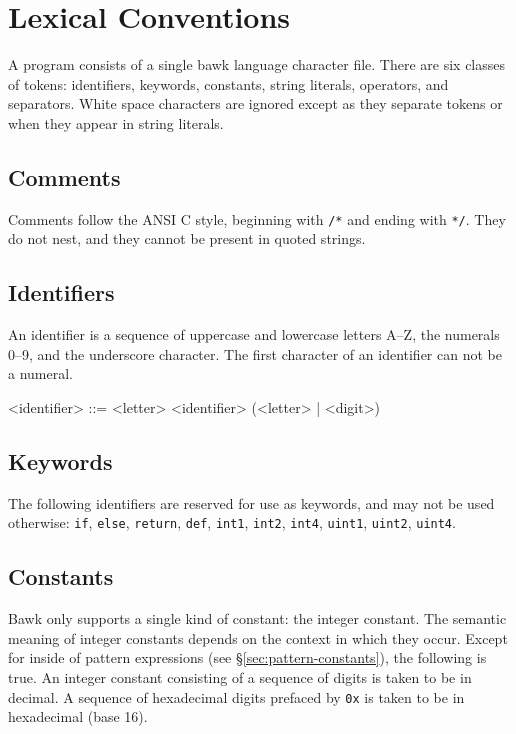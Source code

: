 \section{Lexical Conventions}
A program consists of a single bawk language character file.  There are six classes of tokens: identifiers, keywords, constants, string literals, operators, and separators.  White space characters are ignored except as they separate tokens or when they appear in string literals.

\subsection{Comments}
Comments follow the ANSI C style, beginning with \texttt{/*} and ending with \texttt{*/}.  They do not nest, and they cannot be present in quoted strings.

\subsection{Identifiers}
\label{sec:identifiers}
An identifier is a sequence of uppercase and lowercase letters A--Z, the numerals 0--9, and the underscore character.  The first character of an identifier can not be a numeral.

\begin{grammar}
<identifier> ::= <letter>
\alt <identifier> (<letter> | <digit>)
\end{grammar}

\subsection{Keywords}
The following identifiers are reserved for use as keywords, and may not be used otherwise: \texttt{if}, \texttt{else}, \texttt{return}, \texttt{def}, \texttt{int1}, \texttt{int2}, \texttt{int4}, \texttt{uint1}, \texttt{uint2}, \texttt{uint4}.

\subsection{Constants}
\label{sec:constants}
Bawk only supports a single kind of constant: the integer constant.  The semantic meaning of integer constants depends on the context in which they occur.  Except for inside of pattern expressions (see \S\ref{sec:pattern-constants}), the following is true.  An integer constant consisting of a sequence of digits is taken to be in decimal.  A sequence of hexadecimal digits prefaced by \texttt{0x} is taken to be in hexadecimal (base 16).

